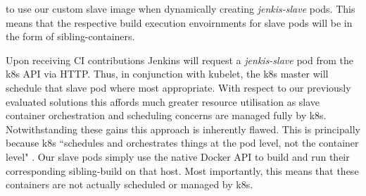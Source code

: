 \documentclass[journal]{IEEEtran}
\begin{document}
to use our custom slave image when dynamically creating \textit{jenkis-slave} pods. 
This means that the respective build execution envoirnments for slave pods will be in the form of sibling-containers. 
\par
Upon receiving CI contributions Jenkins will request a \textit{jenkis-slave} pod from the k8s API via HTTP. 
Thus, in conjunction with kubelet, the k8s master will schedule that slave pod where most appropriate. 
With respect to our previously evaluated solutions this affords much greater resource utilisation as 
slave container orchestration and scheduling concerns are managed fully by k8s.
Notwithstanding these gains this approach is inherently flawed.
This is principally because k8s ``schedules and
orchestrates things at the pod level, not the container level" \citep{Rensin}. Our
slave pods simply use the native
Docker API to build and run their corresponding sibling-build on that host. 
Most importantly, this means that these containers are not actually scheduled or managed
by k8s.
\end{document}
